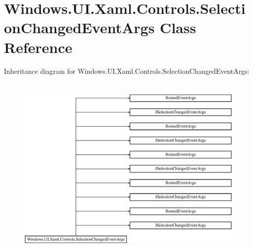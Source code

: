 \hypertarget{class_windows_1_1_u_i_1_1_xaml_1_1_controls_1_1_selection_changed_event_args}{}\section{Windows.\+U\+I.\+Xaml.\+Controls.\+Selection\+Changed\+Event\+Args Class Reference}
\label{class_windows_1_1_u_i_1_1_xaml_1_1_controls_1_1_selection_changed_event_args}
Inheritance diagram for Windows.\+U\+I.\+Xaml.\+Controls.\+Selection\+Changed\+Event\+Args\+:\begin{figure}[H]
\begin{center}
\leavevmode
\includegraphics[height=9.221557cm]{class_windows_1_1_u_i_1_1_xaml_1_1_controls_1_1_selection_changed_event_args}
\end{center}
\end{figure}
